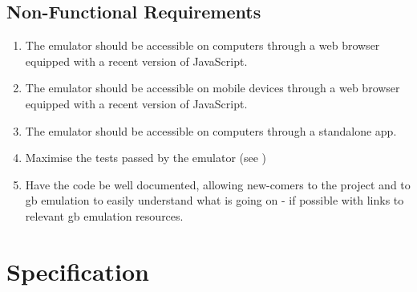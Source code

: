 \documentclass[11pt]{report}
\begin{document}
\subsection{Non-Functional Requirements}

\begin{enumerate}[start=1,label=N\arabic*.]
    \item The emulator should be accessible on computers through a web browser equipped with a recent version of JavaScript.
    \item The emulator should be accessible on mobile devices through a web browser equipped with a recent version of JavaScript.
    \item The emulator should be accessible on computers through a standalone app.
    \item Maximise the tests passed by the emulator (see )
    \item Have the code be well documented, allowing new-comers to the project and to \gls{gb} emulation to easily understand what is going on - if possible with links to relevant \glsdesc{gb} emulation resources.
\end{enumerate}


\section{Specification}
\end{document}
